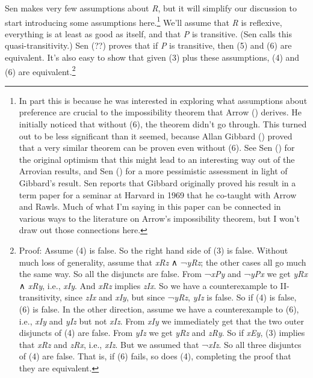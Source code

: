 \documentclass[
  11pt,
  letterpaper,
  DIV=11,
  numbers=noendperiod,
  twoside]{scrartcl}
\begin{document}
Sen makes very few assumptions about \emph{R}, but it will simplify our
discussion to start introducing some assumptions here.\footnote{In part
  this is because he was interested in exploring what assumptions about
  preference are crucial to the impossibility theorem that Arrow
  () derives. He initially noticed that
  without (6), the theorem didn't go through. This turned out to be less
  significant than it seemed, because Allan Gibbard
  () proved that a very similar theorem
  can be proven even without (6). See Sen ()
  for the original optimism that this might lead to an interesting way
  out of the Arrovian results, and Sen
  () for a more pessimistic
  assessment in light of Gibbard's result. Sen reports that Gibbard
  originally proved his result in a term paper for a seminar at Harvard
  in 1969 that he co-taught with Arrow and Rawls. Much of what I'm
  saying in this paper can be connected in various ways to the
  literature on Arrow's impossibility theorem, but I won't draw out
  those connections here.} We'll assume that \emph{R} is reflexive,
everything is at least as good as itself, and that \emph{P} is
transitive. (Sen calls this quasi-transitivity.) Sen
(??) proves that if
\emph{P} is transitive, then (5) and (6) are equivalent. It's also easy
to show that given (3) plus these assumptions, (4) and (6) are
equivalent.\footnote{Proof: Assume (4) is false. So the right hand side
  of (3) is false. Without much loss of generality, assume that
  \emph{xRz} ∧ ¬\emph{yRz}; the other cases all go much the same way. So
  all the disjuncts are false. From ¬\emph{xPy} and ¬\emph{yPx} we get
  \emph{yRx} ∧ \emph{xRy}, i.e., \emph{xIy}. And \emph{xRz} implies
  \emph{zIx}. So we have a counterexample to II-transitivity, since
  \emph{zIx} and \emph{xIy}, but since ¬\emph{yRz}, \emph{yIz} is false.
  So if (4) is false, (6) is false. In the other direction, assume we
  have a counterexample to (6), i.e., \emph{xIy} and \emph{yIz} but not
  \emph{xIz}. From \emph{xIy} we immediately get that the two outer
  disjuncts of (4) are false. From \emph{yIz} we get \emph{yRz} and
  \emph{zRy}. So if \emph{xEy}, (3) implies that \emph{xRz} and
  \emph{zRx}, i.e., \emph{xIz}. But we assumed that ¬\emph{xIz}. So all
  three disjuntcs of (4) are false. That is, if (6) fails, so does (4),
  completing the proof that they are equivalent.}
\end{document}
